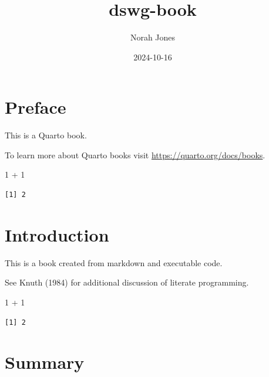 \documentclass[
  letterpaper,
  DIV=11,
  numbers=noendperiod]{scrreprt}
\title{dswg-book}
\author{Norah Jones}
\date{2024-10-16}
\newenvironment{Shaded}{\begin{snugshade}}{\end{snugshade}}
\newcommand{\DecValTok}[1]{\textcolor[rgb]{0.68,0.00,0.00}{#1}}
\newcommand{\SpecialCharTok}[1]{\textcolor[rgb]{0.37,0.37,0.37}{#1}}
\renewcommand*\contentsname{Table of contents}
\newcommand\contentsname{Table of contents}
\begin{document}
\maketitle

\renewcommand*\contentsname{Table of contents}
{
\hypersetup{linkcolor=}
\setcounter{tocdepth}{2}
\tableofcontents
}


\chapter*{Preface}\label{preface}


This is a Quarto book.

To learn more about Quarto books visit
\url{https://quarto.org/docs/books}.

\begin{Shaded}
\begin{Highlighting}[]
\DecValTok{1} \SpecialCharTok{+} \DecValTok{1}
\end{Highlighting}
\end{Shaded}

\begin{verbatim}
[1] 2
\end{verbatim}


\chapter{Introduction}\label{introduction}

This is a book created from markdown and executable code.

See Knuth (1984) for additional discussion of literate programming.

\begin{Shaded}
\begin{Highlighting}[]
\DecValTok{1} \SpecialCharTok{+} \DecValTok{1}
\end{Highlighting}
\end{Shaded}

\begin{verbatim}
[1] 2
\end{verbatim}


\chapter{Summary}\label{summary}
\end{document}
